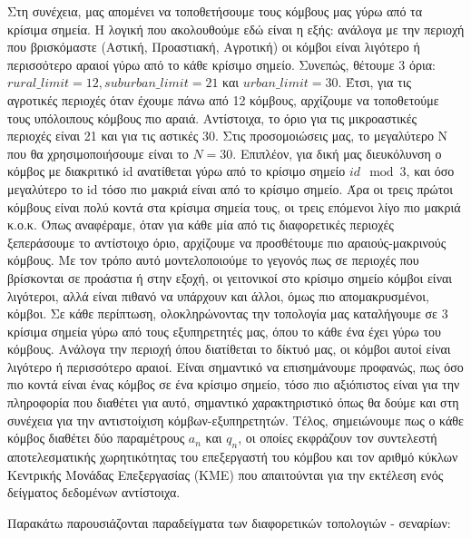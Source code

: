 Στη συνέχεια, μας απομένει να τοποθετήσουμε τους κόμβους μας γύρω από τα κρίσιμα σημεία. Η λογική που ακολουθούμε εδώ είναι η εξής: ανάλογα με την περιοχή που βρισκόμαστε (Αστική, Προαστιακή, Αγροτική) οι κόμβοι είναι λιγότερο ή περισσότερο αραιοί γύρω από το κάθε κρίσιμο σημείο. Συνεπώς, θέτουμε 3 όρια: $rural\_limit = 12, suburban\_limit = 21$ και $urban\_limit = 30$. Έτσι, για τις αγροτικές περιοχές όταν έχουμε πάνω από 12 κόμβους, αρχίζουμε να τοποθετούμε τους υπόλοιπους κόμβους πιο αραιά. Αντίστοιχα, το όριο για τις μικροαστικές περιοχές είναι 21 και για τις αστικές 30. Στις προσομοιώσεις μας, το μεγαλύτερο Ν που θα χρησιμοποιήσουμε είναι το $N = 30$. Επιπλέον, για δική μας διευκόλυνση ο κόμβος με διακριτικό id ανατίθεται γύρω από το κρίσιμο σημείο $id\mod3$, και όσο μεγαλύτερο το id τόσο πιο μακριά είναι από το κρίσιμο σημείο. Άρα οι τρεις πρώτοι κόμβους είναι πολύ κοντά στα κρίσιμα σημεία τους, οι τρεις επόμενοι λίγο πιο μακριά κ.ο.κ. Όπως αναφέραμε, όταν για κάθε μία από τις διαφορετικές περιοχές ξεπεράσουμε το αντίστοιχο όριο, αρχίζουμε να προσθέτουμε πιο αραιούς-μακρινούς κόμβους. Με τον τρόπο αυτό μοντελοποιούμε το γεγονός πως σε περιοχές που βρίσκονται σε προάστια ή στην εξοχή, οι γειτονικοί στο κρίσιμο σημείο κόμβοι είναι λιγότεροι, αλλά είναι πιθανό να υπάρχουν και άλλοι, όμως πιο απομακρυσμένοι, κόμβοι. Σε κάθε περίπτωση, ολοκληρώνοντας την τοπολογία μας καταλήγουμε σε 3 κρίσιμα σημεία γύρω από τους εξυπηρετητές μας, όπου το κάθε ένα έχει γύρω του κόμβους. Ανάλογα την περιοχή όπου διατίθεται το δίκτυό μας, οι κόμβοι αυτοί είναι λιγότερο ή περισσότερο αραιοί. Είναι σημαντικό να επισημάνουμε προφανώς, πως όσο πιο κοντά είναι ένας κόμβος σε ένα κρίσιμο σημείο, τόσο πιο αξιόπιστος είναι για την πληροφορία που διαθέτει για αυτό, σημαντικό χαρακτηριστικό όπως θα δούμε και στη συνέχεια για την αντιστοίχιση κόμβων-εξυπηρετητών. Τέλος, σημειώνουμε πως ο κάθε κόμβος διαθέτει δύο παραμέτρους $a_n$ και $q_n$, οι οποίες εκφράζουν τον συντελεστή αποτελεσματικής χωρητικότητας του επεξεργαστή του κόμβου και τον αριθμό κύκλων Κεντρικής Μονάδας Επεξεργασίας (ΚΜΕ) που απαιτούνται για την εκτέλεση ενός δείγματος δεδομένων αντίστοιχα.

\newpage

Παρακάτω παρουσιάζονται παραδείγματα των διαφορετικών τοπολογιών - σεναρίων: 

